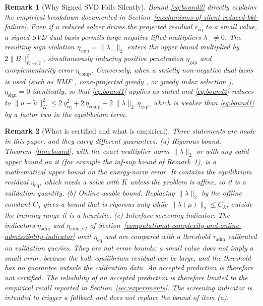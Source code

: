 \documentclass[11pt,a4paper]{article}
\newtheorem{remark}{Remark}
\begin{document}
\begin{remark}[Why Signed SVD Fails Silently]

Bound \eqref{eq:bound2} directly explains the empirical breakdown documented in Section~\ref{mechanisms-of-silent-reduced-kkt-failure}. Even if a reduced solver drives the projected residual \(\tilde{r}_{\mathrm{eq}}\) to a small value, a signed SVD dual basis permits large negative lifted multipliers \(\lambda_- \neq 0\). The resulting sign violation \(\eta_{\mathrm{sign}} = \|\lambda_-\|_2\) enters the upper bound multiplied by \(2 \|B\|_{K \to 2}^2\), simultaneously inducing positive penetration \(\eta_{\mathrm{gap}}\) and complementarity error \(\eta_{\mathrm{comp}}\). Conversely, when a strictly non-negative dual basis is used (such as NMF \cite{balajewicz2016projection}, cone-projected greedy \cite{benaceur2020reduced}, or greedy index selection \cite{sambataro2026model}), \(\eta_{\mathrm{sign}} = 0\) identically, so that \eqref{eq:bound1} applies as stated and \eqref{eq:bound2} reduces to \(\|u - \tilde{u}\|_K^2 \le 2\,\eta_{\mathrm{eq}}^2 + 2\,\eta_{\mathrm{comp}} + 2\,\|\lambda\|_2\,\eta_{\mathrm{gap}}\), which is weaker than \eqref{eq:bound1} by a factor two in the equilibrium term.
\end{remark}

\begin{remark}[What is certified and what is empirical]

Three statements are made in this paper, and they carry different guarantees. (a) \emph{Rigorous bound.} Theorem~\ref{thm:bound}, with the exact multiplier norm \(\|\lambda\|_2\) or with any valid upper bound on it (for example the inf-sup bound of Remark~1), is a mathematical upper bound on the energy-norm error. It contains the equilibrium residual \(\eta_{\mathrm{eq}}\), which needs a solve with \(K\) unless the problem is affine, so it is a validation quantity. (b) \emph{Online-usable bound.} Replacing \(\|\lambda\|_2\) by the offline constant \(C_\lambda\) gives a bound that is rigorous only while \(\|\lambda(\mu)\|_2 \le C_\lambda\); outside the training range it is a heuristic. (c) \emph{Interface screening indicator.} The indicators \(\eta_{\mathrm{adm}}\) and \(\eta_{\mathrm{adm,v2}}\) of Section~\ref{computational-complexity-and-online-admissibility-indicator} omit \(\eta_{\mathrm{eq}}\) and are compared with a threshold \(\tau_{\mathrm{adm}}\) calibrated on validation queries. They are not error bounds: a small value does not imply a small error, because the bulk equilibrium residual can be large, and the threshold has no guarantee outside the calibration data. An accepted prediction is therefore not certified. The reliability of an accepted prediction is therefore limited to the empirical recall reported in Section~\ref{sec:experiments}. The screening indicator is intended to trigger a fallback and does not replace the bound of item (a).
\end{remark}
\end{document}
